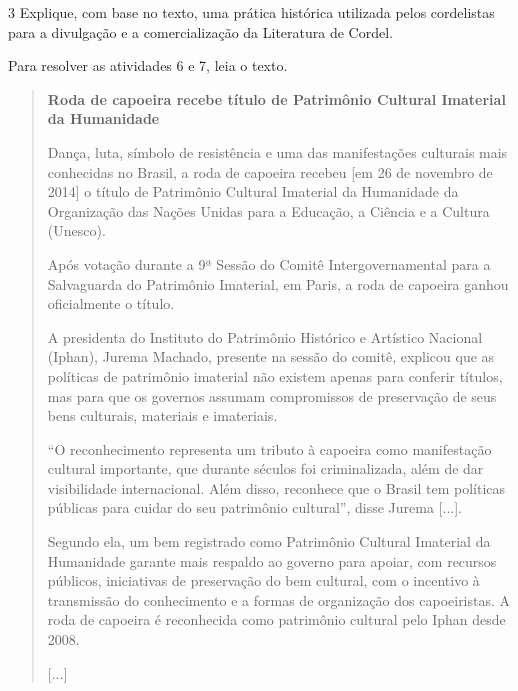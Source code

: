 \num{3} Explique, com base no texto, uma prática histórica utilizada
  pelos cordelistas para a divulgação e a comercialização da Literatura
  de Cordel.


Para resolver as atividades 6 e 7, leia o texto.

\begin{quote}
\textbf{Roda de capoeira recebe título de Patrimônio Cultural Imaterial da Humanidade}

Dança, luta, símbolo de resistência e uma das manifestações culturais mais 
conhecidas no Brasil, a roda de capoeira recebeu [em 26 de novembro de 2014] 
o título de Patrimônio Cultural Imaterial da Humanidade da Organização das 
Nações Unidas para a Educação, a Ciência e a Cultura (Unesco).

Após votação durante a 9ª Sessão do Comitê Intergovernamental para a Salvaguarda 
do Patrimônio Imaterial, em Paris, a roda de capoeira ganhou oficialmente o título.

A presidenta do Instituto do Patrimônio Histórico e Artístico Nacional (Iphan), 
Jurema Machado, presente na sessão do comitê, explicou que as políticas de patrimônio 
imaterial não existem apenas para conferir títulos, mas para que os governos 
assumam compromissos de preservação de seus bens culturais, materiais e imateriais.

``O reconhecimento representa um tributo à capoeira como manifestação cultural 
importante, que durante séculos foi criminalizada, além de dar visibilidade 
internacional. Além disso, reconhece que o Brasil tem políticas públicas para cuidar 
do seu patrimônio cultural'', disse Jurema {[}...{]}.

Segundo ela, um bem registrado como Patrimônio Cultural Imaterial da Humanidade 
garante mais respaldo ao governo para apoiar, com recursos públicos, iniciativas 
de preservação do bem cultural, com o incentivo à transmissão do conhecimento e a 
formas de organização dos capoeiristas. A roda de capoeira é reconhecida como 
patrimônio cultural pelo Iphan desde 2008.

{[}...{]}

\end{quote}

